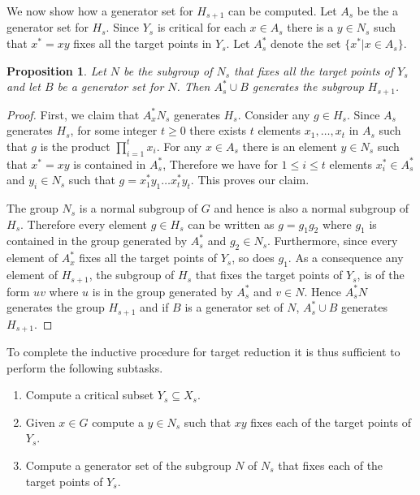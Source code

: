 \documentclass[11pt]{madras}%
\newtheorem{proposition}[theorem]{Proposition}
\theoremstyle{remark}
\begin{document}
We now show how a generator set for $H_{s+1}$ can be computed.  Let
$A_s$ be the a generator set for $H_s$.  Since $Y_s$ is critical for
each $x \in A_s$ there is a $y \in N_s$ such that $x^* = xy$ fixes all
the target points in $Y_s$.  Let $A_s^*$ denote the set $\{ x^* | x
\in A_s \}$. 

\begin{proposition}\label{prop-genset-hsp1}
  Let $N$ be the subgroup of $N_s$ that fixes all the target points of
  $Y_s$ and let $B$ be a generator set for $N$. Then $A_s^* \cup B$
  generates the subgroup $H_{s+1}$.
\end{proposition}
\begin{proof}
  First, we claim that $A_x^* N_s$ generates $H_s$. Consider any $g
  \in H_s$. Since $A_s$ generates $H_s$, for some integer $t \geq 0$
  there exists $t$ elements $x_1,\ldots, x_t$ in $A_s$ such that $g$
  is the product $\prod_{i=1}^t x_i$.  For any $x \in A_s$ there is an
  element $y \in N_s$ such that $x^* = xy$ is contained in $A_s^*$,
  Therefore we have for $1 \leq i \leq t$ elements $x_i^* \in A_s^*$
  and $y_i \in N_s$ such that $g = x_1^* y_1 \ldots x_t^* y_t$. This
  proves our claim.

  The group $N_s$ is a normal subgroup of $G$ and hence is also a
  normal subgroup of $H_s$. Therefore every element $g \in H_s$ can be
  written as $g = g_1g_2$ where $g_1$ is contained in the group
  generated by $A_s^*$ and $g_2 \in N_s$.  Furthermore, since every
  element of $A_x^*$ fixes all the target points of $Y_s$, so does
  $g_1$. As a consequence any element of $H_{s+1}$, the subgroup of
  $H_s$ that fixes the target points of $Y_s$, is of the form $uv$
  where $u$ is in the group generated by $A_s^*$ and $v \in N$.  Hence
  $A_s^* N$ generates the group $H_{s+1}$ and if $B$ is a generator
  set of $N$, $A_s^* \cup B$ generates $H_{s+1}$.
\end{proof}


To complete the inductive procedure for target reduction it is thus
sufficient to perform the following subtasks.
\begin{enumerate}
\item Compute a critical subset $Y_s \subseteq X_s$.\label{compute-Ys}
\item Given $x \in G$ compute a $y \in N_s$ such that $xy$ fixes each
  of the target points of $Y_s$. \label{compute-xstar}
\item Compute a generator set of the subgroup $N$ of $N_s$ that fixes
  each of the target points of $Y_s$.\label{compute-N}
\end{enumerate}
\end{document}
